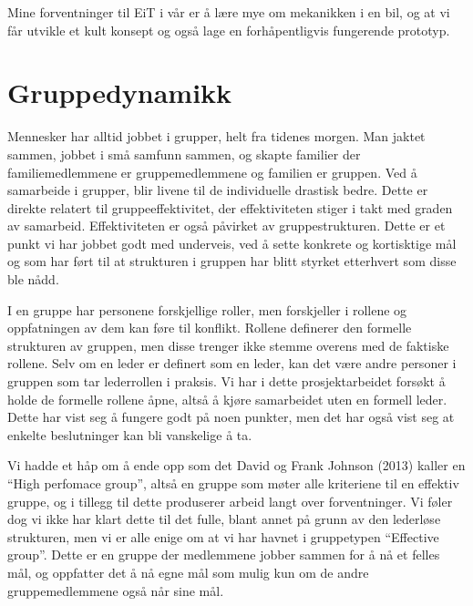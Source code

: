 Mine forventninger til EiT i vår er å lære mye om mekanikken i en bil, og at 
vi får utvikle et kult konsept og også lage en forhåpentligvis fungerende prototyp.

\section{Gruppedynamikk}
Mennesker har alltid jobbet i grupper, helt fra tidenes morgen. Man jaktet 
sammen, jobbet i små samfunn sammen, og skapte familier der familiemedlemmene 
er gruppemedlemmene og familien er gruppen. Ved å samarbeide i grupper, blir 
livene til de individuelle drastisk bedre. Dette er direkte relatert til 
gruppeeffektivitet, der effektiviteten stiger i takt med graden av 
samarbeid. Effektiviteten er også påvirket av gruppestrukturen. Dette er et 
punkt vi har jobbet godt med underveis, ved å sette konkrete og kortisktige 
mål og som har ført til at strukturen i gruppen har blitt styrket etterhvert 
som disse ble nådd.

I en gruppe har personene forskjellige roller, men 
forskjeller i rollene og oppfatningen av dem kan føre til konflikt. Rollene 
definerer den formelle strukturen av gruppen, men disse trenger ikke stemme 
overens med de faktiske rollene. Selv om en leder er definert som en leder, 
kan det være andre personer i gruppen som tar lederrollen i praksis. 
Vi har i dette prosjektarbeidet forsøkt å holde de formelle rollene åpne, 
altså å kjøre samarbeidet uten en formell leder. Dette har vist seg å 
fungere godt på noen punkter, men det har også vist seg at enkelte 
beslutninger kan bli vanskelige å ta. 

Vi hadde et håp om å ende opp som det 
David og Frank Johnson (2013) kaller en ``High perfomace group'', altså en 
gruppe som møter alle kriteriene til en effektiv gruppe, og i tillegg til 
dette produserer arbeid langt over forventninger. Vi føler dog vi ikke har 
klart dette til det fulle, blant annet på grunn av den lederløse
strukturen, men vi er alle enige om at vi har havnet i gruppetypen 
``Effective group''. Dette er en gruppe der medlemmene jobber sammen for å 
nå et felles mål, og oppfatter det å nå egne mål som mulig kun om de andre 
gruppemedlemmene også når sine mål. \cite{Artikkel2}
